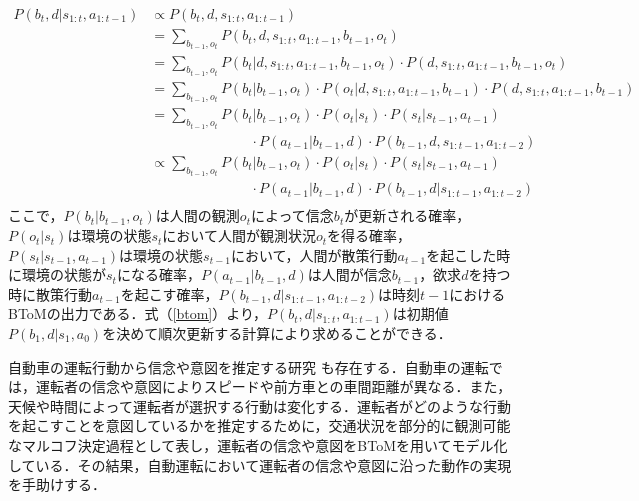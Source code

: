 \begin{equation}
  \begin{split}
  \label{btom}
  P(b_t,d|s_{1:t},a_{1:t-1}) &\propto P(b_t,d,s_{1:t},a_{1:t-1})\\
  &= \sum_{b_{t-1},o_t}P(b_t,d,s_{1:t},a_{1:t-1},b_{t-1},o_t)\\
  &= \sum_{b_{t-1},o_t}P(b_t|d,s_{1:t},a_{1:t-1},b_{t-1},o_t)\cdot P(d,s_{1:t},a_{1:t-1},b_{t-1},o_t)\\
  &= \sum_{b_{t-1},o_t}P(b_t|b_{t-1},o_t)\cdot P(o_t|d,s_{1:t},a_{1:t-1},b_{t-1})\cdot P(d,s_{1:t},a_{1:t-1},b_{t-1})\\
  &= \sum_{b_{t-1},o_t}P(b_t|b_{t-1},o_t)\cdot P(o_t|s_t)\cdot P(s_t|s_{t-1},a_{t-1})\\
  &\hspace{3cm} \cdot P(a_{t-1}|b_{t-1},d)\cdot P(b_{t-1},d,s_{1:t-1},a_{1:t-2})\\
  &\propto \sum_{b_{t-1},o_t}P(b_t|b_{t-1},o_t)\cdot P(o_t|s_t)\cdot P(s_t|s_{t-1},a_{t-1})\\
  &\hspace{3cm} \cdot P(a_{t-1}|b_{t-1},d)\cdot P(b_{t-1},d|s_{1:t-1},a_{1:t-2})\\
  \end{split}
\end{equation}
ここで，$P(b_t|b_{t-1},o_t)$は人間の観測$o_t$によって信念$b_t$が更新される確率，$P(o_t|s_t)$は環境の状態$s_t$において人間が観測状況$o_t$を得る確率，$P(s_t|s_{t-1},a_{t-1})$は環境の状態$s_{t-1}$において，人間が散策行動$a_{t-1}$を起こした時に環境の状態が$s_t$になる確率，$P(a_{t-1}|b_{t-1},d)$は人間が信念$b_{t-1}$，欲求$d$を持つ時に散策行動$a_{t-1}$を起こす確率，$P(b_{t-1},d|s_{1:t-1},a_{1:t-2})$は時刻$t-1$におけるBToMの出力である．式（\ref{btom}）より，$P(b_t,d|s_{1:t},a_{1:t-1})$は初期値$P(b_1,d|s_1,a_0)$を決めて順次更新する計算により求めることができる．


\par
自動車の運転行動から信念や意図を推定する研究 \cite{darwish2020learning}も存在する．自動車の運転では，運転者の信念や意図によりスピードや前方車との車間距離が異なる．また，天候や時間によって運転者が選択する行動は変化する．運転者がどのような行動を起こすことを意図しているかを推定するために，交通状況を部分的に観測可能なマルコフ決定過程として表し，運転者の信念や意図をBToMを用いてモデル化している．その結果，自動運転において運転者の信念や意図に沿った動作の実現を手助けする．

